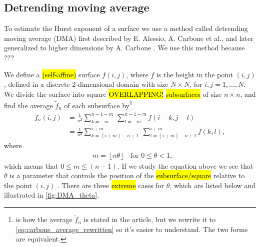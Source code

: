 \subsection{Detrending moving average}
To estimate the Hurst exponent of a surface we use a method called detrending moving average (DMA) first described by E. Alessio, A. Carbone et al.\cite{alessio2002dma}, and later generalized to higher dimensions by A. Carbone \cite{carbone2007algorithm}. We use this method because ??? 


We define a \hl{(self-affine)} surface $f(i,j)$, where $f$ is the height in the point $(i,j)$, defined in a discrete 2-dimensional domain with size $N\times N$, for $i,j = 1,\dots,N$. We divide the surface into square \hl{OVERLAPPING!} \hl{subsurfaces} of size $n \times n$, and find the average $\tilde f_n$ of each subsurface by\footnote{ is how the average $\tilde f_n$ is stated in the article\cite{carbone2007algorithm}, but we rewrite it to \cref{eq:carbone_average_rewritten} so it's easier to understand. The two forms are equivalent.} 
\begin{align}
    \tilde f_n(i,j) 
    &= \frac{1}{n^2}\sum_{k=-m}^{n-1-m} ~ \sum_{l=-m}^{n-1-m} f(i-k, j-l) \label{eq:carbone_average}\\
    &= \frac{1}{n^2} \sum_{k=(i+m)-n+1}^{i+m} ~ \sum_{l=(i+m)-n+1}^{i+m} f(k, l), \label{eq:carbone_average_rewritten}
\end{align}
where
\begin{align*}
    &m = \left \lfloor n\theta \right \rfloor &\text{for }0 \leq \theta < 1,
\end{align*}
which means that $0 \leq m \leq (n-1)$. If we study the equation above we see that $\theta$ is a parameter that controls the position of the \hl{subsurface/square} relative to the point $(i,j)$%
. There are three \hl{extreme} cases for $\theta$, which are listed below and illustrated in \cref{fig:DMA_theta}.%
%
